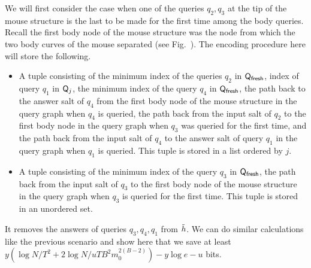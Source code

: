 {
We will first consider the case when one of the queries $q_2,q_3$ at the tip of the mouse structure is the last to be made for the first time among the body queries. Recall the first body node of the mouse structure was the node from which the two body curves of the mouse separated (see Fig.~). The encoding procedure here will store the following.
\begin{itemize}
  \item A tuple consisting of the minimum index of the queries $q_2$ in $\mathsf{Q}_\textsf{fresh}$, index of query $q_1$ in $\mathsf{Q}_j$, the minimum index of the query $q_4$ in $\mathsf{Q}_\textsf{fresh}$, the path back to the answer salt of $q_4$ from the first body node of the mouse structure in the query graph when $q_4$ is queried, the path back from the input salt of $q_2$ to the first body node in the query graph when  $q_3$ was queried for the first time, and the path back from the input salt of $q_4$ to the answer salt of query $q_1$ in the query graph when $q_1$ is queried. This tuple is stored in a list ordered by $j$.
  \item A tuple consisting of the minimum index of the query $q_3$ in $\mathsf{Q}_\textsf{fresh}$, the path back from the input salt of $q_3$ to the first body node of the mouse structure in the query graph when $q_3$ is queried for the first time. This tuple is stored in an unordered set.
\end{itemize}
It removes the answers of queries $q_3,q_4,q_1$ from $\tilde{h}$.
We can do similar calculations like the previous scenario and show here that we save at least $y(\log N/T^2 +2\log N/uTB^2m_0^{2(B-2)})- y\log e -u$ bits.

}

